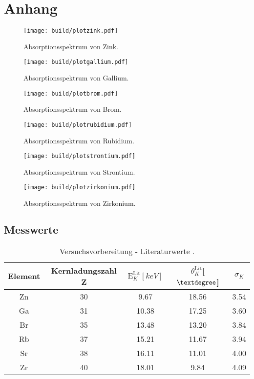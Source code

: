 \section{Anhang}

\begin{figure}[h]
  \centering
  \texttt{[image: build/plotzink.pdf]}
  \caption{Absorptionsspektrum von Zink.}
  \label{fig:plotzink}
\end{figure}
\begin{figure}[h]
  \centering
  \texttt{[image: build/plotgallium.pdf]}
  \caption{Absorptionsspektrum von Gallium.}
  \label{fig:plotgallium}
\end{figure}
\begin{figure}[h]
  \centering
  \texttt{[image: build/plotbrom.pdf]}
  \caption{Absorptionsspektrum von Brom.}
  \label{fig:plotbrom}
\end{figure}
\begin{figure}[h]
  \centering
  \texttt{[image: build/plotrubidium.pdf]}
  \caption{Absorptionsspektrum von Rubidium.}
  \label{fig:plotrubidium}
\end{figure}
\begin{figure}[h]
  \centering
  \texttt{[image: build/plotstrontium.pdf]}
  \caption{Absorptionsspektrum von Strontium.}
  \label{fig:plotstrontium}
\end{figure}
\begin{figure}[h]
  \centering
  \texttt{[image: build/plotzirkonium.pdf]}
  \caption{Absorptionsspektrum von Zirkonium.}
  \label{fig:plotzirkonium}
\end{figure}


\subsection{Messwerte}

\begin{table}
        \caption{Versuchsvorbereitung - Literaturwerte \cite{database}.}
        \centering
        \label{tab:vorbereitung}
        \begin{tabular}{c c c c c}
            \toprule
              Element & Kernladungszahl Z & $\text{E}_K^{\text{Lit}} [\si{keV}]$  & $\theta_K^{\text{Lit}} $[$\textdegree$] & $\sigma_K$ \\
            \midrule
                Zn & 30 & 9.67  &  18.56 & 3.54\\
                Ga & 31 & 10.38 &  17.25 & 3.60\\
                Br & 35 & 13.48 &  13.20 & 3.84\\
                Rb & 37 & 15.21 &  11.67 & 3.94\\
                Sr & 38 & 16.11 &  11.01 & 4.00\\
                Zr & 40 & 18.01 &  9.84  & 4.09\\
            \bottomrule    
        \end{tabular}
\end{table}

